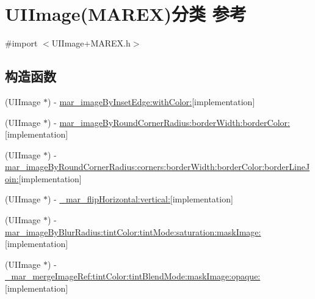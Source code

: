 \hypertarget{category_u_i_image_07_m_a_r_e_x_08}{}\section{U\+I\+Image(M\+A\+R\+EX)分类 参考}
\label{category_u_i_image_07_m_a_r_e_x_08}


{\ttfamily \#import $<$U\+I\+Image+\+M\+A\+R\+E\+X.\+h$>$}

\subsection*{构造函数}
\begin{DoxyCompactItemize}
\item 
(U\+I\+Image $\ast$) -\/ \hyperlink{category_u_i_image_07_m_a_r_e_x_08_a1f3f88bbfb6919e7d106711e21ce85b6}{mar\+\_\+image\+By\+Inset\+Edge\+:with\+Color\+:}{\ttfamily  \mbox{[}implementation\mbox{]}}
\item 
(U\+I\+Image $\ast$) -\/ \hyperlink{category_u_i_image_07_m_a_r_e_x_08_aa4a0ad3a1b7d3e8a680be3b183e77ea4}{mar\+\_\+image\+By\+Round\+Corner\+Radius\+:border\+Width\+:border\+Color\+:}{\ttfamily  \mbox{[}implementation\mbox{]}}
\item 
(U\+I\+Image $\ast$) -\/ \hyperlink{category_u_i_image_07_m_a_r_e_x_08_a897c3947a128aa49079f463ef0f37ad8}{mar\+\_\+image\+By\+Round\+Corner\+Radius\+:corners\+:border\+Width\+:border\+Color\+:border\+Line\+Join\+:}{\ttfamily  \mbox{[}implementation\mbox{]}}
\item 
(U\+I\+Image $\ast$) -\/ \hyperlink{category_u_i_image_07_m_a_r_e_x_08_a8b2fb5c5f7a1abe83f4779c9f151e9c4}{\+\_\+mar\+\_\+flip\+Horizontal\+:vertical\+:}{\ttfamily  \mbox{[}implementation\mbox{]}}
\item 
(U\+I\+Image $\ast$) -\/ \hyperlink{category_u_i_image_07_m_a_r_e_x_08_a54c70b75e0b09a77d182fd29be0a572b}{mar\+\_\+image\+By\+Blur\+Radius\+:tint\+Color\+:tint\+Mode\+:saturation\+:mask\+Image\+:}{\ttfamily  \mbox{[}implementation\mbox{]}}
\item 
(U\+I\+Image $\ast$) -\/ \hyperlink{category_u_i_image_07_m_a_r_e_x_08_a81016c59ca04f115e8a81953b5cad818}{\+\_\+mar\+\_\+merge\+Image\+Ref\+:tint\+Color\+:tint\+Blend\+Mode\+:mask\+Image\+:opaque\+:}{\ttfamily  \mbox{[}implementation\mbox{]}}
\end{DoxyCompactItemize}

